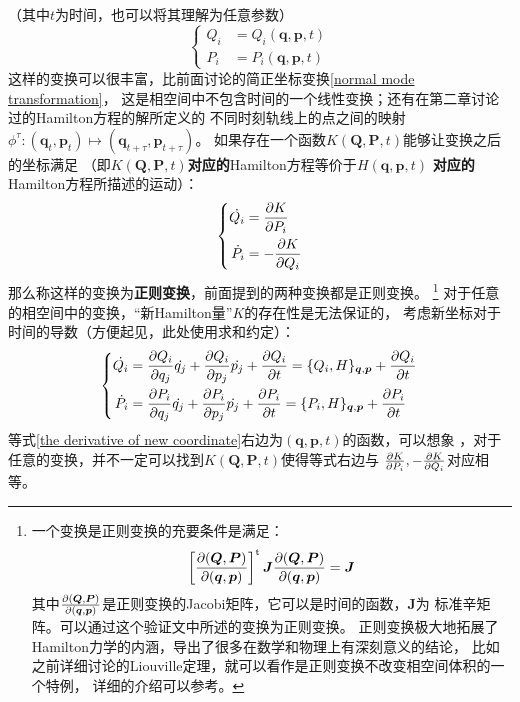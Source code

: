     （其中$t$为时间，也可以将其理解为任意参数）
    \begin{equation}
        \left\{
        \begin{split}
            Q_i &= Q_i(\bm{q},\bm{p}, t)\\
            P_i &= P_i(\bm{q}, \bm{p}, t)
        \end{split}
        \right.
    \end{equation}
    这样的变换可以很丰富，比前面讨论的简正坐标变换\ref{normal mode transformation}，
    这是相空间中不包含时间的一个线性变换；还有在第二章讨论过的Hamilton方程的解所定义的
    不同时刻轨线上的点之间的映射$\phi^{\tau}:(\bm{q}_{t},\bm{p}_{t})\mapsto(\bm{q}_{t+\tau},\bm{p}_{t+\tau})$。
    如果存在一个函数$K(\bm{Q}, \bm{P}, t)$能够让变换之后的坐标满足
    （即$K(\bm{Q}, \bm{P}, t)$\textbf{对应的}Hamilton方程等价于$H(\bm{q},\bm{p},t)$
    \textbf{对应的}Hamilton方程所描述的运动）：
    \begin{equation}
        \left\{
        \begin{split}
            \dot{Q_i} &= \frac{\partial{K}}{\partial{P_i}}\\
            \dot{P_{i}} &= -\frac{\partial{K}}{\partial{Q_i}}
        \end{split}
        \right.
    \end{equation}
    那么称这样的变换为\textbf{正则变换}，前面提到的两种变换都是正则变换。
    \footnote{
        一个变换是正则变换的充要条件是满足：
        \begin{equation}
            \left[\frac{\partial{(\bm{Q},\bm{P})}}{\partial{(\bm{q}, \bm{p})}}\right]^{\mathrm{t}}\bm{J}\frac{\partial{(\bm{Q},\bm{P})}}{\partial{(\bm{q}, \bm{p})}} = \bm{J}
        \end{equation}
        其中$\frac{\partial{(\bm{Q},\bm{P})}}{\partial{(\bm{q}, \bm{p})}}$是正则变换的Jacobi矩阵，它可以是时间的函数，$\bm{J}$为
        标准辛矩阵。可以通过这个验证文中所述的变换为正则变换。
        正则变换极大地拓展了Hamilton力学的内涵，导出了很多在数学和物理上有深刻意义的结论，
        比如之前详细讨论的Liouville定理，就可以看作是正则变换不改变相空间体积的一个特例，
        详细的介绍可以参考\cite{Goldstein2000Classical}。
    }
    对于任意的相空间中的变换，“新Hamilton量”$K$的存在性是无法保证的，
    考虑新坐标对于时间的导数（方便起见，此处使用求和约定）：
    \begin{equation}
        \left\{
            \begin{split}
                \dot{Q_i} &= \frac{\partial{Q_i}}{\partial{q_{j}}}\dot{q_{j}} + \frac{\partial{Q_i}}{\partial{p_j}}\dot{p_j}
                + \frac{\partial{Q_i}}{\partial{t}} = \{Q_i, H\}_{\bm{q},\bm{p}} + \frac{\partial{Q_i}}{\partial{t}}\\
                \dot{P_i} &= \frac{\partial{P_i}}{\partial{q_{j}}}\dot{q_{j}} + \frac{\partial{P_i}}{\partial{p_j}}\dot{p_j}
                + \frac{\partial{P_i}}{\partial{t}} = \{P_i, H\}_{\bm{q},\bm{p}} + \frac{\partial{P_i}}{\partial{t}}
            \end{split}
        \right.
        \label{the derivative of new coordinate}
    \end{equation}
    等式\ref{the derivative of new coordinate}右边为$(\bm{q},\bm{p},t)$的函数，可以想象
    ，对于任意的变换，并不一定可以找到$K(\bm{Q},\bm{P},t)$使得等式右边与
    $\frac{\partial{K}}{\partial{P_{i}}},-\frac{\partial{K}}{\partial{Q_i}}$对应相等。
    \par 

